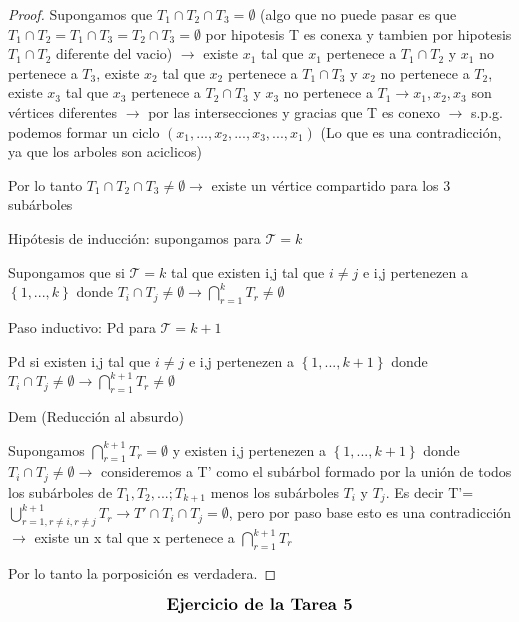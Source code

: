 \documentclass{article}
\begin{document}
\begin{enumerate}
\begin{proof}
            Supongamos que $T_1 \cap T_2 \cap T_3 = \emptyset$ (algo que no puede pasar es que $T_1 \cap T_2 = T_1 \cap T_3 = T_2 \cap T_3  = \emptyset$ por hipotesis T es conexa y tambien por hipotesis $T_1 \cap T_2$ diferente del vacio) $\rightarrow$ existe $x_1$ tal que $x_1$ pertenece a $T_1 \cap T_2$ y $x_1$ no pertenece a $T_3$, existe $x_2$ tal que $x_2$ pertenece a $T_1 \cap T_3$ y $x_2$ no pertenece a $T_2$, existe $x_3$ tal que $x_3$ pertenece a $T_2 \cap T_3$ y $x_3$ no pertenece a $T_1  \rightarrow x_1, x_2, x_3$ son vértices diferentes $\rightarrow$ por las intersecciones  y gracias que T  es conexo  $\rightarrow$ s.p.g. podemos formar un ciclo $(x_1, ... ,x_2, ... ,x_3, ...,x_1)$ (Lo que es una contradicción, ya que los arboles son aciclicos)

            Por lo tanto $T_1 \cap T_2 \cap T_3   \neq
            \emptyset \rightarrow$ existe un vértice compartido para los 3 subárboles

            Hipótesis de inducción: supongamos para $\mathcal{T} = k$

            Supongamos que si $\mathcal{T} = k$ tal que existen i,j tal que $i \neq j$ e i,j pertenezen a $\left\lbrace 1,...,k \right\rbrace$ donde $T_i \cap T_j \neq \emptyset \rightarrow  \bigcap_{r=1}^{k}{T_r} \neq \emptyset$

            Paso inductivo: Pd para $\mathcal{T} = k+1$

            Pd si existen i,j tal que $i \neq j$ e i,j pertenezen a $\left\lbrace 1,...,k+1 \right\rbrace$ donde $T_i \cap T_j \neq \emptyset \rightarrow  \bigcap_{r=1}^{k+1}{T_r} \neq \emptyset$

            Dem (Reducción al absurdo)

            Supongamos $\bigcap_{r=1}^{k+1}{T_r} = \emptyset$ y existen i,j pertenezen a $\left\lbrace 1,...,k+1 \right\rbrace$ donde $T_i \cap T_j \neq \emptyset \rightarrow $ consideremos a T' como el subárbol formado por la unión de todos los subárboles de $T_1, T_2,...;T_{k+1}$ menos los subárboles $T_i$ y $T_j$. Es decir T'= $\bigcup_{r=1, r \neq i,  r \neq j }^{k+1}{T_r} \rightarrow T' \cap T_i \cap T_j = \emptyset$, pero por paso base esto es una contradicción $\rightarrow$ existe un x tal que x pertenece a  $\bigcap_{r=1}^{k+1}{T_r}$

            Por lo tanto la porposición es verdadera.
        \end{proof}

  $$\text{\textbf{\large Ejercicio de la Tarea 5}}$$


\end{enumerate}
\end{document}
